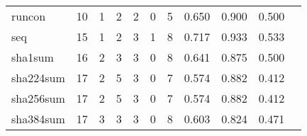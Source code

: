 \begin{longtable}{lp{1.2cm}p{1.2cm}p{1.2cm}p{1.2cm}p{1.2cm}p{1.2cm}p{1.2cm}p{1.2cm}p{1.2cm}p{1.2cm}}
runcon    &                                    10 &                                                  1 &                                                  2 &                                                  2 &                                                  0 &                                                  5 &                                         0.650 &                                              0.900 &                                              0.500 \\
seq       &                                    15 &                                                  1 &                                                  2 &                                                  3 &                                                  1 &                                                  8 &                                         0.717 &                                              0.933 &                                              0.533 \\
sha1sum   &                                    16 &                                                  2 &                                                  3 &                                                  3 &                                                  0 &                                                  8 &                                         0.641 &                                              0.875 &                                              0.500 \\
sha224sum &                                    17 &                                                  2 &                                                  5 &                                                  3 &                                                  0 &                                                  7 &                                         0.574 &                                              0.882 &                                              0.412 \\
sha256sum &                                    17 &                                                  2 &                                                  5 &                                                  3 &                                                  0 &                                                  7 &                                         0.574 &                                              0.882 &                                              0.412 \\
sha384sum &                                    17 &                                                  3 &                                                  3 &                                                  3 &                                                  0 &                                                  8 &                                         0.603 &                                              0.824 &                                              0.471 \\

\end{longtable}
